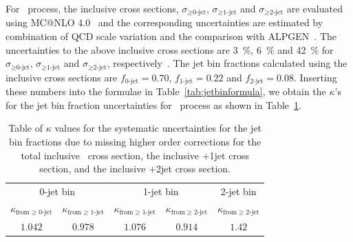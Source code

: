 For \qqww\ process, the inclusive cross sections, $\sigma_{\ge\textrm{0-jet}}$,
$\sigma_{\ge\textrm{1-jet}}$ and $\sigma_{\ge\textrm{2-jet}}$ are evaluated using 
MC@NLO 4.0~\cite{Frixione:2002ik} 
and the corresponding uncertainties are estimated by combination of  
QCD scale variation and the comparison with ALPGEN~\cite{Mangano:2002ea}. 
The uncertainties to the above inclusive cross sections are 3~\%,  6~\% and 42~\% for  
$\sigma_{\ge\textrm{0-jet}}$, $\sigma_{\ge\textrm{1-jet}}$ 
and $\sigma_{\ge\textrm{2-jet}}$, respectively~\cite{Dittmaier:2012vm}.  
The jet bin fractions calculated using the inclusive cross sections are 
$f_{\textrm{0-jet}}=0.70$, $f_{\textrm{1-jet}}=0.22$ and $f_{\textrm{2-jet}}=0.08$.
Inserting these numbers into the formulae in Table~\ref{tab:jetbinformula}, 
we obtain the $\kappa$'s for the jet bin fraction uncertainties for \qqww\ process
as shown in Table~\ref{tab:jetbinexcl_ww}. 
%
\begin{table}[!htbp]
\begin{center}
\begin{tabular}{cc|cc|c}
\hline
\multicolumn{2}{c|}{0-jet bin}  & \multicolumn{2}{c|}{1-jet bin}  & 2-jet bin \\
$\kappa_{\mathrm{from } \ge \textrm{0-jet}}$ & $\kappa_{\mathrm{from } \ge \textrm{1-jet}}$
& $\kappa_{\mathrm{from } \ge \textrm{1-jet}}$ & $\kappa_{\mathrm{from } \ge \textrm{2-jet}}$
& $\kappa_{\mathrm{from } \ge \textrm{2-jet}}$   \\
\hline \hline
$1.042$  & $ 0.978$  & $ 1.076$  & $ 0.914$  & $ 1.42$  \\
\hline
\end{tabular}
\caption{ Table of $\kappa$ values for the systematic uncertainties for the jet bin
fractions due to missing higher order corrections for the total inclusive \qqww\
cross section, the inclusive \qqww+1jet cross section, and the inclusive \qqww+2jet
cross section. }
\label{tab:jetbinexcl_ww}
\end{center}
\end{table}



